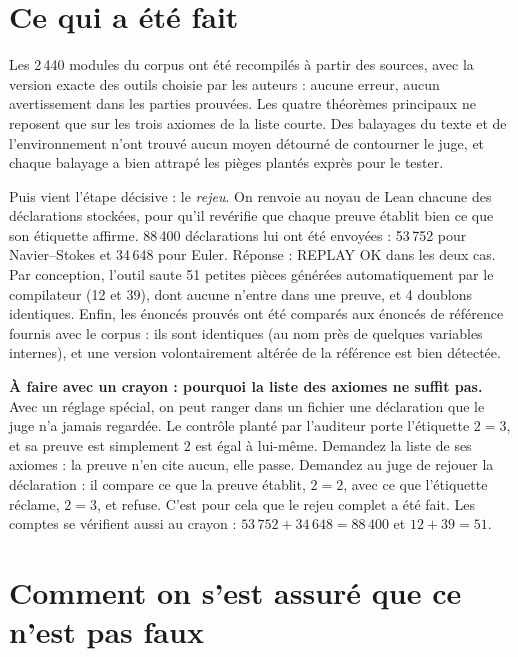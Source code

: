 \section*{Ce qui a été fait}

Les 2\,440 modules du corpus ont été recompilés à partir des sources, avec la version exacte des
outils choisie par les auteurs : aucune erreur, aucun avertissement dans les parties prouvées.
Les quatre théorèmes principaux ne reposent que sur les trois axiomes de la liste courte. Des
balayages du texte et de l'environnement n'ont trouvé aucun moyen détourné de contourner le juge,
et chaque balayage a bien attrapé les pièges plantés exprès pour le tester.

Puis vient l'étape décisive : le \emph{rejeu}. On renvoie au noyau de Lean chacune des
déclarations stockées, pour qu'il revérifie que chaque preuve établit bien ce que son étiquette
affirme. 88\,400 déclarations lui ont été envoyées : 53\,752 pour Navier--Stokes et 34\,648 pour
Euler. Réponse : \og REPLAY OK\fg{} dans les deux cas. Par conception, l'outil saute 51 petites
pièces générées automatiquement par le compilateur (12 et 39), dont aucune n'entre dans une
preuve, et 4 doublons identiques. Enfin, les énoncés prouvés ont été comparés aux énoncés de
référence fournis avec le corpus : ils sont identiques (au nom près de quelques variables internes), et une version volontairement altérée de
la référence est bien détectée.

\begin{encadre}
\textbf{À faire avec un crayon : pourquoi la liste des axiomes ne suffit pas.} Avec un réglage spécial, on peut
ranger dans un fichier une déclaration que le juge n'a jamais regardée. Le contrôle planté par
l'auditeur porte l'étiquette \og $2=3$\fg{}, et sa \og preuve\fg{} est simplement \og $2$ est égal
à lui-même\fg{}. Demandez la liste de ses axiomes : la preuve n'en cite aucun, elle passe.
Demandez au juge de rejouer la déclaration : il compare ce que la preuve établit, $2=2$, avec ce
que l'étiquette réclame, $2=3$, et refuse. C'est pour cela que le rejeu complet a été fait. Les
comptes se vérifient aussi au crayon : $53\,752+34\,648=88\,400$ et $12+39=51$.
\end{encadre}

\section*{Comment on s'est assuré que ce n'est pas faux}

